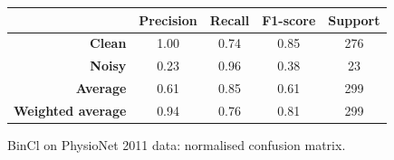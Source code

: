 \documentclass[a4paper,10pt]{article}
\begin{document}
\begin{figure}[p]
{\begin{minipage}{0.6\textwidth}
			\caption{BinCl on PhysioNet 2011 data: normalised confusion matrix.}%
			\label{fig:bincl_phynet_cm}
		\end{minipage}
	}
	\baselineskip
	\begin{tabular}{r|c|c|c|c}
		                          & \textbf{Precision} & \textbf{Recall} & \textbf{F1-score} & \textbf{Support} \\ \midrule
		\textbf{Clean}            & 1.00               & 0.74            & 0.85              & 276              \\
		\textbf{Noisy}            & 0.23               & 0.96            & 0.38              & 23               \\ \midrule
		\textbf{Average}          & 0.61               & 0.85            & 0.61              & 299              \\
		\textbf{Weighted average} & 0.94               & 0.76            & 0.81              & 299
	\end{tabular}
	\label{tab:bincl_phynet_cr}
\end{figure}
\end{document}
